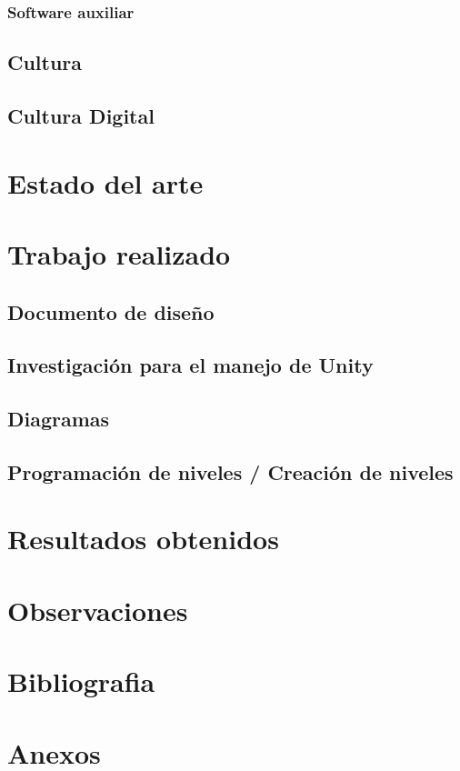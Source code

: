 \documentclass[11pt,letterpaper]{article}
\begin{document}
			\subsubsection{Software auxiliar}
		\subsection{Cultura}
		\subsection{Cultura Digital}		
	\section{Estado del arte}
	\section{Trabajo realizado}
		\subsection{Documento de diseño}
		\subsection{Investigación para el manejo de Unity}
		\subsection{Diagramas}
		\subsection{Programación de niveles / Creación de niveles}
	\section{Resultados obtenidos}
	\section{Observaciones}
	\section{Bibliografia}	
	\section{Anexos}
\end{document}
